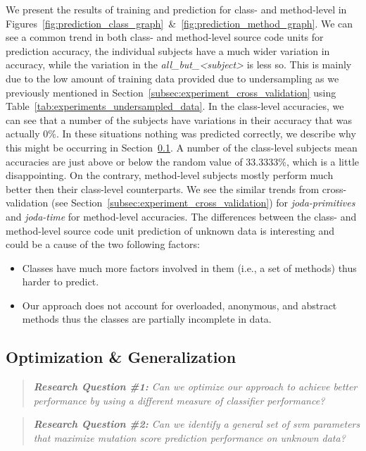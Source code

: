 We present the results of training and prediction for class- and method-level in Figures~\ref{fig:prediction_class_graph}~\&~\ref{fig:prediction_method_graph}. We can see a common trend in both class- and method-level source code units for prediction accuracy, the individual subjects have a much wider variation in accuracy, while the variation in the \emph{all\_but\_<subject>} is less so. This is mainly due to the low amount of training data provided due to undersampling as we previously mentioned in Section~\ref{subsec:experiment_cross_validation} using Table~\ref{tab:experiments_undersampled_data}. In the class-level accuracies, we can see that a number of the subjects have variations in their accuracy that was actually 0\%. In these situations nothing was predicted correctly, we describe why this might be occurring in Section~\ref{subsec:experiment_optimization_generalization}. A number of the class-level subjects mean accuracies are just above or below the random value of 33.3333\%, which is a little disappointing. On the contrary, method-level subjects mostly perform much better then their class-level counterparts. We see the similar trends from cross-validation (see Section~\ref{subsec:experiment_cross_validation}) for \emph{joda-primitives} and \emph{joda-time} for method-level accuracies. The differences between the class- and method-level source code unit prediction of unknown data is interesting and could be a cause of the two following factors:

\begin{itemize}
  \item Classes have much more factors involved in them (i.e., a set of methods) thus harder to predict.
  \item Our approach does not account for overloaded, anonymous, and abstract methods thus the classes are partially incomplete in data.
\end{itemize}


\subsection{Optimization \& Generalization}
\label{subsec:experiment_optimization_generalization}
\begin{quote}
	\emph{\textbf{Research Question \#1:} Can we optimize our approach to achieve better performance by using a different measure of classifier performance?}
\end{quote}

\begin{quote}
  \emph{\textbf{Research Question \#2:} Can we identify a general set of \gls{svm} parameters that maximize mutation score prediction performance on unknown data?}
\end{quote}

